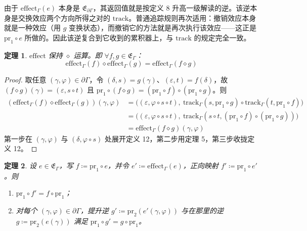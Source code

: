 \documentclass[11pt,a4paper]{article}
\theoremstyle{plain}
\newtheorem{theorem}{定理}
\theoremstyle{definition}
\theoremstyle{remark}
\begin{document}
由于 $\mathrm{effect}_\Gamma(e)$ 本身是 $\mathfrak{E}_{\partial\Gamma}$，其返回值就是按定义 8 升高一级解读的逆。该逆本身是交换效应两个方向所得之对的 $\mathrm{track}$。普通追踪规则再次适用：撤销效应本身就是一种效应（用 $g$ 变换状态），而撤销它的方法就是再次执行该效应——这正是 $\mathrm{pr}_1 \circ e$ 所做的。因此该逆复合到它收到的累积器上，与 $\mathrm{track}$ 的规定完全一致。

\begin{theorem}\label{thm:effect-preserves}
$\mathrm{effect}$ 保持 $\diamond$ 运算。即 $\forall f, g \in \mathfrak{E}_\Gamma$：
\[
\mathrm{effect}_\Gamma(f) \diamond \mathrm{effect}_\Gamma(g) = \mathrm{effect}_\Gamma(f \diamond g) \tag{15}
\]
\end{theorem}

\begin{proof}
取任意 $(\gamma, \varphi) \in \partial\Gamma$，令 $(\delta, s) = g(\gamma)$、$(\varepsilon, t) = f(\delta)$，故 $(f \diamond g)(\gamma) = (\varepsilon, s \circ t)$ 且 $\mathrm{pr}_1 \circ (f \diamond g) = (\mathrm{pr}_1 \circ f) \circ (\mathrm{pr}_1 \circ g)$。则
\begin{align*}
(\mathrm{effect}_\Gamma(f) \diamond \mathrm{effect}_\Gamma(g))(\gamma, \varphi)
&= \big((\varepsilon, \varphi \circ s \circ t),\ \mathrm{track}_\Gamma(s, \mathrm{pr}_1 \circ g) \circ \mathrm{track}_\Gamma(t, \mathrm{pr}_1 \circ f)\big) \\
&= \big((\varepsilon, \varphi \circ s \circ t),\ \mathrm{track}_\Gamma(s \circ t, (\mathrm{pr}_1 \circ f) \circ (\mathrm{pr}_1 \circ g))\big) \\
&= \mathrm{effect}_\Gamma(f \diamond g)(\gamma, \varphi)
\end{align*}
第一步在 $(\gamma, \varphi)$ 与 $(\delta, \varphi \circ s)$ 处展开定义 12，第二步用定理 5，第三步收拢定义 12。
\end{proof}

\begin{theorem}\label{thm:effect-lift-commute}
设 $e \in \mathfrak{E}_\Gamma$，写 $f \coloneqq \mathrm{pr}_1 \circ e$，并令 $e' \coloneqq \mathrm{effect}_\Gamma(e)$，正向映射 $f' \coloneqq \mathrm{pr}_1 \circ e'$。则
\begin{enumerate}
\item $\mathrm{pr}_1 \circ f' = f \circ \mathrm{pr}_1$；
\item 对每个 $(\gamma, \varphi) \in \partial\Gamma$，提升逆 $g' \coloneqq \mathrm{pr}_2(e'(\gamma, \varphi))$ 与在那里的逆 $g \coloneqq \mathrm{pr}_2(e(\gamma))$ 满足 $\mathrm{pr}_1 \circ g' = g \circ \mathrm{pr}_1$。
\end{enumerate}
\end{theorem}
\end{document}
